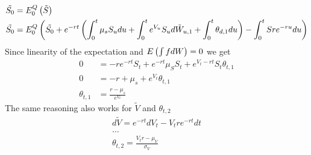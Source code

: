\documentclass[document.tex]{subfiles}
\begin{document}
\begin{align*}
	\tilde{S_0} &= E^Q_0 \left( \tilde{S} \right) \\
	\tilde{S_0} &= E^Q_0 \left( 	\tilde{S_0} +  e^{-rt} \left( \int_0^t \mu_s S_u du 
	+ \int_0^t e^{V_u} S_u d\tilde{W}_{u,1} + \int_0^t \theta_{d,1} du \right)  - \int_0^t S r e^{-ru} du
 \right) 
\end{align*}
Since linearity of the expectation  and $E\left( \int f dW \right) =0$ we get 
\begin{align*}
0 &=	-re^{-rt} S_t + e^{-rt} \mu_S S_t + e^{V_t -rt} S_t \theta_{t,1} \\
0 &=	-r + \mu_s + e^{V_t} \theta_{t,1}  \\
	\theta_{t,1} &= \frac{r-\mu_s}{e^{V_t}}
\end{align*}
The same reasoning also works for $\tilde{V}$ and $\theta_{t,2}$
\begin{align*}
	d \tilde{V} = e^{-rt} d V_t - V_t r e^{-rt} dt \\
	\dots \\
	\theta_{t,2} = \frac{V_t r - \mu_V }{\sigma_V}
\end{align*}
\end{document}
